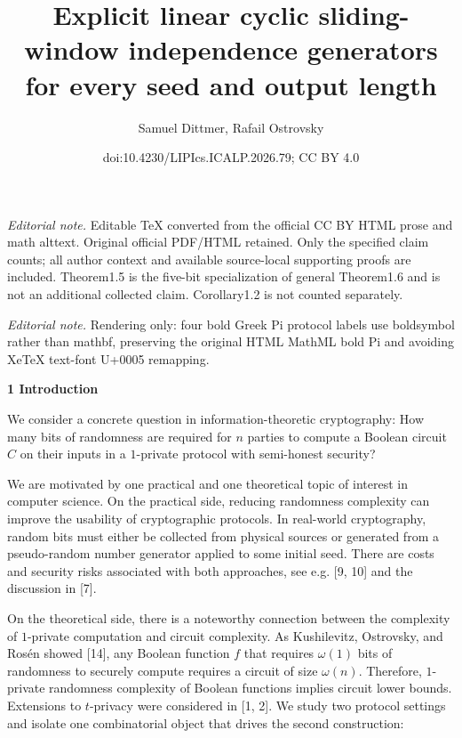 \documentclass[10pt,a4paper]{article}
\title{Explicit linear cyclic sliding-window independence generators for every seed and output length}
\author{Samuel Dittmer, Rafail Ostrovsky}
\date{doi:10.4230/LIPIcs.ICALP.2026.79; CC BY 4.0}
\begin{document}
\maketitle
\noindent\textit{Editorial note.} Editable TeX converted from the official CC BY HTML prose and math alttext. Original official PDF/HTML retained. Only the specified claim counts; all author context and available source-local supporting proofs are included. Theorem1.5 is the five-bit specialization of general Theorem1.6 and is not an additional collected claim. Corollary1.2 is not counted separately.\par\medskip
\noindent\textit{Editorial note.} Rendering only: four bold Greek Pi protocol labels use boldsymbol rather than mathbf, preserving the original HTML MathML bold Pi and avoiding XeTeX text-font U+0005 remapping.\par\medskip


\par\medskip\noindent\textbf{
1 Introduction}\par




We consider a concrete question in information-theoretic cryptography: How many bits of randomness are required for $n$ parties to compute a Boolean circuit $C$ on their inputs in a $1$-private protocol with semi-honest security?\par




We are motivated by one practical and one theoretical topic of interest in computer science. On the practical side, reducing randomness complexity can improve the usability of cryptographic protocols. In real-world cryptography, random bits must either be collected from physical sources or generated from a pseudo-random number generator applied to some initial seed. There are costs and security risks associated with both approaches, see e.g. [9, 10] and the discussion in [7].\par




On the theoretical side, there is a noteworthy connection between the complexity of $1$-private computation and circuit complexity. As Kushilevitz, Ostrovsky, and Rosén showed [14], any Boolean function $f$ that requires $\omega(1)$ bits of randomness to securely compute requires a circuit of size $\omega(n)$. Therefore, $1$-private randomness complexity of Boolean functions implies circuit lower bounds. Extensions to $t$-privacy were considered in [1, 2].
We study two protocol settings and isolate one combinatorial object that drives the second construction:\par
\end{document}

